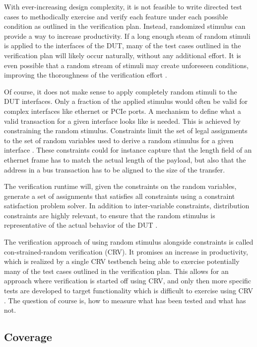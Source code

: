 With ever-increasing design complexity, it is not feasible to write directed test cases to methodically exercise and
verify each feature under each possible condition as outlined in the verification plan. Instead, randomized stimulus
can provide a way to increase productivity. If a long enough steam of random stimuli is applied to the interfaces of
the DUT, many of the test cases outlined in the verification plan will likely occur naturally, without any
additional effort. It is even possible that a random stream of stimuli may create unforeseen conditions, improving
the thoroughness of the verification effort \cite[Ch. 1]{bergeron2005verification}.

Of course, it does not make sense to apply completely random stimuli to the DUT interfaces. Only a fraction of the
applied stimulus would often be valid for complex interfaces like ethernet or PCIe ports. A mechanism to define what
a valid transaction for a given interface looks like is needed. This is achieved by constraining the random stimulus.
Constraints limit the set of legal assignments to the set of random variables used to derive a random stimulus for a
given interface \cite[Ch. 3]{bergeron2012writing}. These constraints could for instance capture that the length field
of an ethernet frame has to match the actual length of the payload, but also that the address in a bus transaction
has to be aligned to the size of the transfer.

The verification runtime will, given the constraints on the random variables, generate a set of assignments that
satisfies all constraints using a constraint satisfaction problem solver. In addition to inter-variable
constraints, distribution constraints are highly relevant,
to ensure that the random stimulus is representative of the actual behavior of the DUT \cite[Sec. 7.5]{flake2020a}.

The verification approach of using random stimulus alongside constraints is called con-strained-random verification
(CRV). It promises an increase in productivity, which is realized by a single CRV testbench being able to exercise
potentially many of the test cases outlined in the verification plan. This allows for an approach where verification
is started off using CRV, and only then more specific tests are developed to target functionality which is difficult
to exercise using CRV \cite[Ch. 3]{bergeron2012writing}. The question of course is, how to measure what has been
tested and what has not.

\subsection{Coverage} %

